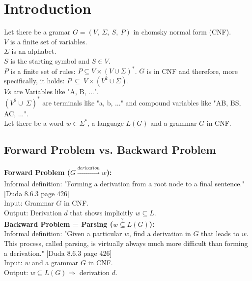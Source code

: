 
\section{Introduction}\label{Introduction}

\noindent Let there be a gramar $G=(V,\ \Sigma,\ S,\ P)$ in chomsky normal form (CNF).\\
$V$ is a finite set of variables. \\
$\Sigma$ is an alphabet. \\
$S$ is the starting symbol and $S \in V$. \\
$P$ is a finite set of rules: $P \subseteq V \times (V \cup \Sigma)^{*}$. $G$ is in CNF and therefore, more specifically, it holds:  $P\ \subseteq\ V \times (V^{2} \cup \Sigma)$.\\

\noindent $Vs$ are Variables like "A, B, ...".\\
$(V^2 \cup\ \Sigma)^{*}$ are terminals like "a, b, ..." and compound variables like "AB, BS, AC, ...". \\

\noindent Let there be a word $w \in \Sigma^*$, a language $L(G)$ and a grammar $G$ in CNF. \\

\subsection{Forward Problem vs. Backward Problem}

\noindent\textbf{Forward Problem ($G \xrightarrow[]{derivation} w$):}\\
Informal definition: "Forming a derivation from a root node to a final sentence."  [Duda 8.6.3 page 426]\\
Input: Grammar $G$ in CNF.\\
Output: Derivation $d$ that shows implicitly $w \subseteq L$.\\

\noindent\textbf{Backward Problem = Parsing ($w\overset{?}{\subseteq}L(G)$):}\\
Informal definition: "Given a particular $w$, find a derivation in $G$ that leads to $w$. This process, called parsing, is virtually always much more difficult than forming a derivation."  [Duda 8.6.3 page 426]\\
Input: $w$ and a grammar $G$ in CNF.\\
Output: $w \subseteq L(G) \Longrightarrow$ derivation $d$.\\

